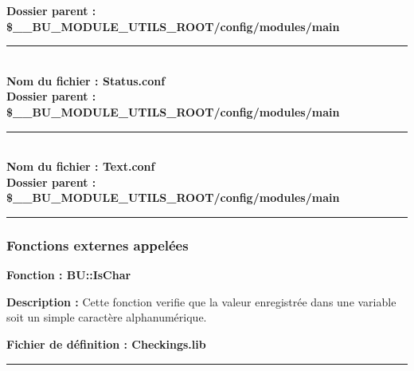 \documentclass[a4paper,10pt]{article}
\begin{document}
\textbf{Dossier parent : \color{orange}\$\_\_BU\_MODULE\_UTILS\_ROOT\color{lime}/config/modules/main}\\[1\baselineskip]



\color{lime}\par\noindent\rule{\textwidth}{0.4pt}\color{white}\\[1\baselineskip]

\textbf{Nom du fichier : \color{lime}Status.conf}\\[1\baselineskip]

\textbf{Dossier parent : \color{orange}\$\_\_BU\_MODULE\_UTILS\_ROOT\color{lime}/config/modules/main}\\[1\baselineskip]



\color{lime}\par\noindent\rule{\textwidth}{0.4pt}\color{white}\\[1\baselineskip]

\textbf{Nom du fichier : \color{lime}Text.conf}\\[1\baselineskip]

\textbf{Dossier parent : \color{orange}\$\_\_BU\_MODULE\_UTILS\_ROOT\color{lime}/config/modules/main}\\[1\baselineskip]



\color{blue}\par\noindent\rule{\textwidth}{0.4pt}\color{white}

\color{blue}
\subsubsection{Fonctions externes appelées}\color{white}

\textbf{Fonction : \color{mauve}BU::IsChar}\\[1\baselineskip]

\begin{justify}
    \textbf{Description :} Cette fonction verifie que la valeur enregistrée dans une variable soit un simple caractère alphanumérique.
\end{justify}

\textbf{Fichier de définition : \color{lime}Checkings.lib}\\[1\baselineskip]



\color{blue}\par\noindent\rule{\textwidth}{0.4pt}\color{white}
\end{document}
